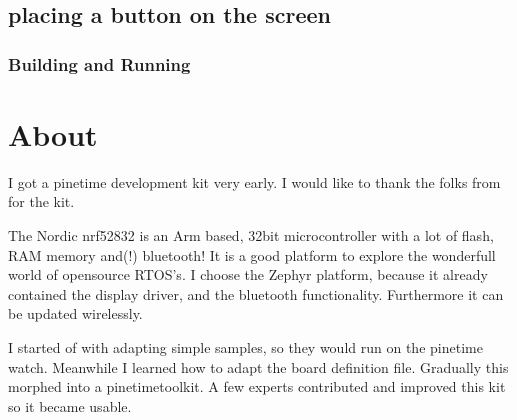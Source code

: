 \documentclass[letterpaper,10pt,english]{sphinxmanual}
\begin{document}
\section{placing a button on the screen}
\label{\detokenize{behind/lvglbutton:placing-a-button-on-the-screen}}\label{\detokenize{behind/lvglbutton::doc}}
\begin{sphinxVerbatim}[commandchars=\\\{\}]
                             
\end{sphinxVerbatim}


\subsection{Building and Running}
\label{\detokenize{behind/lvglbutton:building-and-running}}
\begin{sphinxVerbatim}[commandchars=\\\{\}]

\end{sphinxVerbatim}


\chapter{About}
\label{\detokenize{about:about}}\label{\detokenize{about::doc}}
I got a pinetime development kit very early.
I would like to thank the folks from  for the kit.

The Nordic nrf52832 is an Arm based, 32bit microcontroller with a lot of flash, RAM memory and(!) bluetooth!
It is a good platform to explore the wonderfull world of opensource RTOS’s.
I choose the Zephyr platform, because it already contained the display driver, and the bluetooth functionality.
Furthermore it can be updated wirelessly.

I started of with adapting simple samples, so they would run on the pinetime watch.
Meanwhile I learned how to adapt the board definition file.
Gradually this morphed into a pinetime\sphinxhyphen{}toolkit.
A few experts contributed and improved this kit so it became usable.
\end{document}

